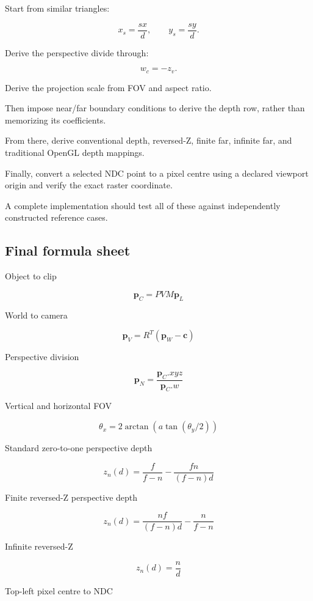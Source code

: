 Start from similar triangles:

\[
 x_s=\frac{sx}{d}, \qquad y_s=\frac{sy}{d}.
\]

Derive the perspective divide through:

\[
 w_c=-z_v.
\]

Derive the projection scale from FOV and aspect ratio.

Then impose near/far boundary conditions to derive the depth row, rather than memorizing its coefficients.

From there, derive conventional depth, reversed-Z, finite far, infinite far, and traditional OpenGL depth mappings.

Finally, convert a selected NDC point to a pixel centre using a declared viewport origin and verify the exact raster coordinate.

A complete implementation should test all of these against independently constructed reference cases.

\subsection{Final formula sheet}\label{02-foundations-ii-ch037-final-formula-sheet}

\hypertarget{02-foundations-ii-ch037-final-formula-sheet}{}

Object to clip

\[
 \boxed{ \mathbf p_C=PVM\mathbf p_L }
\]

World to camera

\[
 \boxed{ \mathbf p_V=R^T(\mathbf p_W-\mathbf c) }
\]

Perspective division

\[
 \boxed{ \mathbf p_N= \frac{\mathbf p_C.xyz}{\mathbf p_C.w} }
\]

Vertical and horizontal FOV

\[
 \boxed{ \theta_x= 2\arctan \left( a\tan(\theta_y/2) \right) }
\]

Standard zero-to-one perspective depth

\[
 \boxed{ z_n(d)= \frac f{f-n} - \frac{fn}{(f-n)d} }
\]

Finite reversed-Z perspective depth

\[
 \boxed{ z_n(d)= \frac{nf}{(f-n)d} - \frac n{f-n} }
\]

Infinite reversed-Z

\[
 \boxed{ z_n(d)=\frac nd }
\]

Top-left pixel centre to NDC

